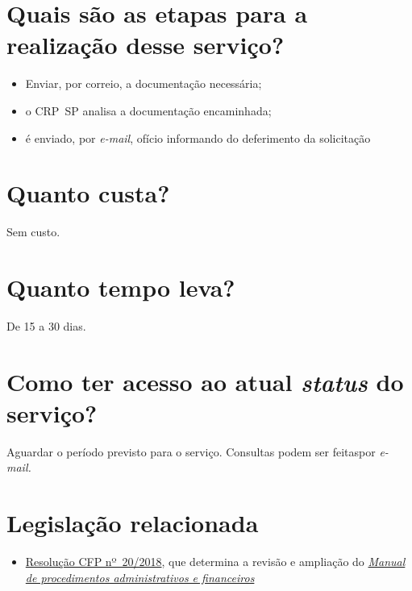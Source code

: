 \section{Quais são as etapas para a realização desse serviço?}

\begin{itemize}
  \item  Enviar, por correio, a documentação necessária;
  \item  o CRP~SP analisa a documentação encaminhada;
  \item  é enviado, por \emph{e-mail}, ofício informando do deferimento da  solicitação
\end{itemize}

\section{Quanto custa?}

Sem custo.

\section{Quanto tempo leva?}

De 15 a 30 dias.

\section{Como ter acesso ao atual \emph{status} do serviço?}

Aguardar o período previsto para o serviço. Consultas podem ser feitaspor \emph{e-mail.}

\section{Legislação relacionada}

\begin{itemize}
  \item  \href{https://transparencia.cfp.org.br/wp-content/uploads/sites/7/2020/05/Manual-de-Procedimentos-Administrativos-e-Financeiro-CFP-RES-20.2018.pdf}{\href{https://atosoficiais.com.br/cfp/resolucao-administrativa-financeira-n-20-2018-altera-o-manual-de-procedimentos-administrativo-e-financeiro-do-sistema-conselhos-de-psicologia-anexo-da-resolucao-cfp-n-202018-a-resolucao-cfp-n-03-2007-a-resolucao-cfp-n-16-2019-e-da-outras-providencias}{Resolução  CFP nº~20/2018}}, que determina a revisão e ampliação do  \href{https://transparencia.cfp.org.br/wp-content/uploads/sites/7/2020/05/Manual-de-Procedimentos-Administrativos-e-Financeiro-CFP-RES-20.2018.pdf}{\emph{Manual  de procedimentos administrativos e financeiros}}
\end{itemize}


